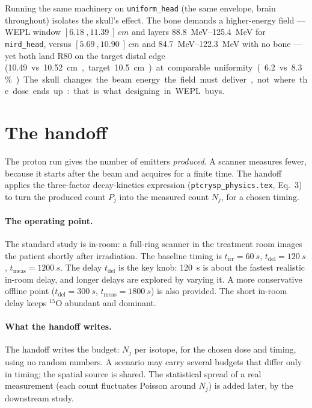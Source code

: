 \documentclass[11pt]{article}
\newcommand{\Ox}[1]{{}^{#1}\mathrm{O}}
\newcommand{\tirr}{t_{\mathrm{irr}}}
\newcommand{\tdel}{t_{\mathrm{del}}}
\newcommand{\tmeas}{t_{\mathrm{meas}}}
\newcommand{\file}[1]{\texttt{#1}}
\begin{document}
Running the same machinery on \file{uniform\_head} (the same envelope, brain
throughout) isolates the skull's effect. The bone demands a higher-energy field ---
WEPL window $[\SI{6.18}{},\SI{11.39}{}]\,\si{cm}$ and layers
\SIrange{88.8}{125.4}{MeV} for \file{mird\_head}, versus
$[\SI{5.69}{},\SI{10.90}{}]\,\si{cm}$ and \SIrange{84.7}{122.3}{MeV} with no bone
--- yet both land R80 on the target distal edge (\SI{10.49} vs \SI{10.52}{cm},
target \SI{10.5}{cm}) at comparable uniformity (\SI{6.2} vs \SI{8.3}{\percent}). The
skull changes the beam energy the field must deliver, not where the dose ends up:
that is what designing in WEPL buys.

\section{The handoff}
\label{sec:handoff}

The proton run gives the number of emitters \emph{produced}. A scanner measures
fewer, because it starts after the beam and acquires for a finite time. The
handoff applies the three-factor decay-kinetics expression
(\file{ptcrysp\_physics.tex}, Eq.~3) to turn the produced count $P_j$ into the
measured count $N_j$, for a chosen timing.

\paragraph{The operating point.} The standard study is in-room: a full-ring
scanner in the treatment room images the patient shortly after irradiation. The
baseline timing is $\tirr=\SI{60}{s}$, $\tdel=\SI{120}{s}$, $\tmeas=\SI{1200}{s}$.
The delay $\tdel$ is the key knob: \SI{120}{s} is about the fastest realistic
in-room delay, and longer delays are explored by varying it. A more conservative
offline point ($\tdel=\SI{300}{s}$, $\tmeas=\SI{1800}{s}$) is also provided. The
short in-room delay keeps $\Ox{15}$ abundant and dominant.

\paragraph{What the handoff writes.} The handoff writes the budget: $N_j$ per
isotope, for the chosen dose and timing, using no random numbers. A scenario may
carry several budgets that differ only in timing; the spatial source is shared. The
statistical spread of a real measurement (each count fluctuates Poisson around
$N_j$) is added later, by the downstream study.
\end{document}
